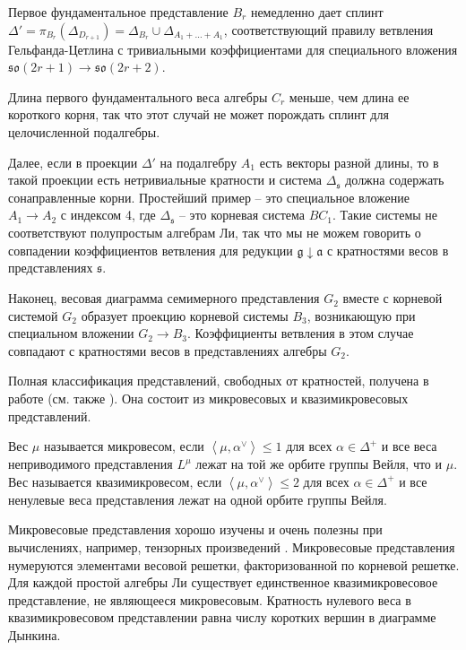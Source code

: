 \documentclass[12pt]{article}
\newcommand{\gf}{\mathfrak{g}}
\newcommand{\af}{\mathfrak{a}}
\newcommand{\sfr}{\mathfrak{s}}
\begin{document}
Первое фундаментальное представление  $B_{r}$ немедленно дает сплинт $\Delta'=\pi_{B_{r}}\left(
\Delta_{D_{r+1}}\right) = \Delta_{B_{r}}\cup \Delta_{A_{1}+\dots+A_{1}}$, соответствующий правилу
ветвления Гельфанда-Цетлина с тривиальными коэффициентами для специального вложения
$\mathfrak{so}(2r+1)\to \mathfrak{so}(2r+2)$.

Длина первого фундаментального веса алгебры   $C_{r}$ меньше, чем длина ее короткого корня, так что
этот случай не может порождать сплинт для целочисленной подалгебры. 

Далее, если в проекции  $\Delta'$ на подалгебру  $A_{1}$ есть векторы разной длины, то в такой
проекции есть нетривиальные кратности и система $\Delta_{\sfr}$ должна содержать сонаправленные
корни. Простейший пример -- это специальное вложение $A_{1}\to A_{2}$ с индексом 4, где
$\Delta_{\sfr}$ -- это корневая система $BC_{1}$. Такие системы не соответствуют полупростым
алгебрам Ли, так что мы не можем говорить о совпадении коэффициентов ветвления для редукции
$\gf\downarrow \af$ с кратностями весов в представлениях $\sfr$.


Наконец, весовая диаграмма семимерного представления $G_{2}$ вместе с корневой системой $G_{2}$
образует проекцию корневой системы $B_{3}$, возникающую при специальном вложении $G_{2}\to B_{3}$.
Коэффициенты ветвления в этом случае совпадают с кратностями весов в представлениях алгебры $G_{2}$.

Полная классификация представлений, свободных от кратностей, получена в работе
\cite{howe1995perspectives} (см. также \cite{stembridge2003multiplicity}). Она состоит из
микровесовых и квазимикровесовых представлений.

Вес  $\mu$ называется микровесом, если  $\left<\mu,\alpha^{\vee}\right>\leq 1$ для всех $\alpha\in
\Delta^{+}$ и все веса неприводимого представления  $L^{\mu}$ лежат на той же орбите группы Вейля,
что и $\mu$. Вес называется квазимикровесом, если $\left<\mu,\alpha^{\vee}\right>\leq 2$ для всех
$\alpha\in \Delta^{+}$ и все ненулевые веса представления лежат на одной орбите группы Вейля.

Микровесовые представления хорошо изучены и очень полезны при вычислениях, например, тензорных произведений
\cite{stembridge2003multiplicity,stembridge2001computational}. Микровесовые представления нумеруются
элементами весовой решетки, факторизованной по корневой решетке. Для каждой простой алгебры Ли
существует единственное квазимикровесовое представление, не являющееся микровесовым.  Кратность
нулевого веса в квазимикровесовом представлении равна числу коротких вершин в диаграмме Дынкина.
\end{document}
